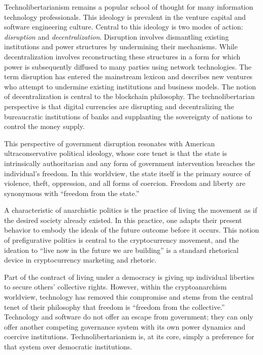 Technolibertarianism remains a popular school of thought for many information
technology professionals. This ideology is prevalent in the venture capital and
software engineering culture. Central to this ideology is two modes of action:
\textit{disruption} and \textit{decentralization}. Disruption involves
dismantling existing institutions and power structures by undermining their
mechanisms. While decentralization involves reconstructing these structures in a
form for which power is subsequently diffused to many parties using network
technologies. The term disruption has entered the mainstream lexicon and
describes new ventures who attempt to undermine existing institutions and
business models. The notion of decentralization is central to the blockchain
philosophy. The technolibertarian perspective is that digital currencies are
disrupting and decentralizing the bureaucratic institutions of banks and
supplanting the sovereignty of nations to control the money supply.


This perspective of government disruption resonates with American
ultraconservative political ideology, whose core tenet is that the state is
intrinsically authoritarian and any form of government intervention breaches the
individual's freedom. In this worldview, the state itself is the primary source
of violence, theft, oppression, and all forms of coercion. Freedom and liberty
are synonymous with ``freedom from the state.''

A characteristic of anarchistic politics is the practice of living the movement
as if the desired society already existed. In this practice, one adapts their
present behavior to embody the ideals of the future outcome before it occurs.
This notion of prefigurative politics is central to the cryptocurrency movement,
and the ideation to ``live now in the future we are building'' is a standard
rhetorical device in cryptocurrency marketing and rhetoric.
\cite{jeong_bitcoin_2013}


Part of the contract of living under a democracy is giving up individual
liberties to secure others' collective rights. However, within the
cryptoanarchism worldview, technology has removed this compromise and stems from
the central tenet of their philosophy that freedom is ``freedom from the
collective.'' Technology and software do not offer an escape from government;
they can only offer another competing governance system with its own power
dynamics and coercive institutions. Technolibertarianism is, at its core, simply
a preference for that system over democratic institutions.
\cite{bogost_cryptocurrency_2017, golumbia_politics_2016}

